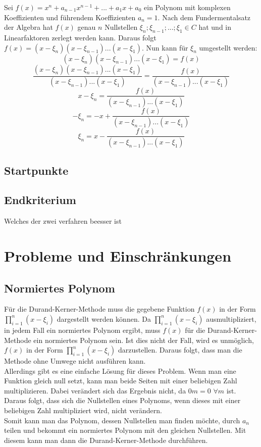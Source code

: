 \documentclass[12pt]{article}
\begin{document}
Sei $f(x) = x^n + a_{n-1} x^{n-1} + ... + a_1 x + a_0$ ein Polynom mit komplexen Koeffizienten und führendem Koeffizienten $a_n = 1$. Nach dem Fundermentalsatz der Algebra hat $f(x)$ genau $n$ Nullstellen $\xi_n;\xi_{n-1};...;\xi_1 \in C$ hat und in Linearfaktoren zerlegt werden kann. Daraus folgt $f(x) = (x - \xi_n)(x - \xi_{n-1})...(x - \xi_1)$. Nun kann für $\xi_n$ umgestellt werden:
\[(x - \xi_n)(x - \xi_{n-1})...(x - \xi_1) = f(x)\]
\[\frac{(x - \xi_n)(x - \xi_{n-1})...(x - \xi_1)}{(x - \xi_{n-1})...(x - \xi_1)} = \frac{f(x)}{(x - \xi_{n-1})...(x - \xi_1)}\]
\[x - \xi_n = \frac{f(x)}{(x - \xi_{n-1})...(x - \xi_1)}\]
\[- \xi_n = - x + \frac{f(x)}{(x - \xi_{n-1})...(x - \xi_1)}\]
\[\xi_n = x - \frac{f(x)}{(x - \xi_{n-1})...(x - \xi_1)}\]

\subsection{Startpunkte}

\subsection{Endkriterium}
Welches der zwei verfahren beesser ist

\section{Probleme und Einschränkungen}
\subsection{Normiertes Polynom}
Für die Durand-Kerner-Methode muss die gegebene Funktion $f(x)$ in der Form $\prod_{i=1}^n (x-\xi_i)$ dargestellt werden können. Da $\prod_{i=1}^n (x-\xi_i)$ ausmultipliziert, in jedem Fall ein normiertes Polynom ergibt, muss $f(x)$ für die Durand-Kerner-Methode ein normiertes Polynom sein.
Ist dies nicht der Fall, wird es unmöglich, $f(x)$ in der Form $\prod_{i=1}^n (x-\xi_i)$ darzustellen. Daraus folgt, dass man die Methode ohne Umwege nicht ausführen kann. \\
Allerdings gibt es eine einfache Lösung für dieses Problem. Wenn man eine Funktion gleich null setzt, kann man beide Seiten mit einer beliebigen Zahl multiplizieren. Dabei verändert sich das Ergebnis nicht, da $0m = 0$ \space $\forall m$ ist. Daraus folgt, dass sich die Nullstellen eines Polynoms, wenn dieses mit einer beliebigen Zahl multipliziert wird, nicht verändern. \\
Somit kann man das Polynom, dessen Nullstellen man finden möchte, durch $a_n$ teilen und bekommt ein normiertes Polynom mit den gleichen Nullstellen. Mit diesem kann man dann die Durand-Kerner-Methode durchführen.
\end{document}
